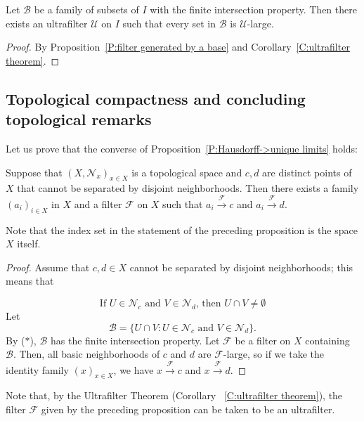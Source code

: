 \documentclass{scrartcl}
\newcommand{\SB}{\mathscr{B}}
\newcommand{\SU}{\mathscr{U}}
\begin{document}
\begin{corollary}
\label{C:base extended to ultrafilter}
Let $\SB$ be a family of subsets of $I$ with the finite intersection property. Then there exists an ultrafilter $\SU$ on $I$ such that every set in $\SB$ is $\SU$-large.
\end{corollary}

\begin{proof}
By Proposition~\ref{P:filter generated by a base} and Corollary~\ref{C:ultrafilter theorem}.
\end{proof}

\subsection{Topological compactness and concluding topological remarks}


Let us prove that the converse of Proposition~\ref{P:Hausdorff->unique limits} holds:

\begin{proposition}
\label{P:unique limits->Hausdorff}
Suppose that $(X,\mathscr{N}_x)_{x\in X}$ is a topological space and $c,d$ are distinct points of $X$ that cannot be separated by disjoint neighborhoods. Then there exists a family $(a_i)_{i\in X}$ in $X$ and a filter $\mathscr{F}$ on $X$ such that $a_i\overset{\mathscr{F}}\to c$ and $a_i\overset{\mathscr{F}}\to d$.
\end{proposition}

Note that the index set in the statement of the preceding proposition is the space $X$ itself.

\begin{proof}
Assume that $c,d\in X$ cannot be separated by disjoint neighborhoods; this means that 

\[
\tag{$*$}
\text{If $U\in\mathscr{N}_c$ and $V\in\mathscr{N}_d$, then $U\cap V\neq \emptyset$}
\]
Let
\[
\mathscr{B}=\{U\cap V \colon U\in\mathscr{N}_c
\text{ and } V\in\mathscr{N}_d \}.
\]
By ($*$), $\mathscr{B}$ has the finite intersection property. Let $\mathscr{F}$ be a filter on $X$ containing  $\mathscr{B}$. Then, all basic neighborhoods of $c$ and $d$ are $\mathscr{F}$-large, so if we take the identity family $(x)_{x\in X}$, we have $x\overset{\mathscr{F}}\to c$ and $x\overset{\mathscr{F}}\to d$.
\end{proof}

Note that, by the Ultrafilter Theorem (Corollary ~\ref{C:ultrafilter theorem}), the filter $\mathscr{F}$ given by the preceding proposition can be taken to be an ultrafilter.
\end{document}
